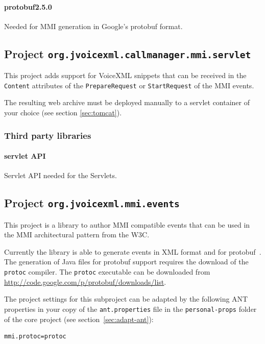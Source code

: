 \documentclass[11pt,a4paper]{article}
\begin{document}
\paragraph{protobuf2.5.0}

Needed for MMI generation in Google's protobuf format.

\subsection{Project \texttt{org.jvoicexml.callmanager.mmi.servlet}}
\label{sec:mmi-servlet}

This project adds support for VoiceXML snippets that can be received
in the \lstinline{Content} attributes of the \lstinline{PrepareRequest}
or \lstinline{StartRequest} of the MMI events.

The resulting web archive must be deployed manually to a servlet container
of your choice (see section \ref{sec:tomcat}).

\subsubsection{Third party libraries}

\paragraph{servlet API}

Servlet API needed for the Servlets.

\subsection{Project \texttt{org.jvoicexml.mmi.events}}
\label{sec:mmi-events}

This project is a library to author MMI compatible events that can be used in
the MMI architectural pattern from the W3C.

Currently the library is able to generate events in XML format and for
protobuf~\cite{google:protobuf}. The generation of Java files for protobuf
support requires the download of the \texttt{protoc} compiler. The \texttt{protoc}
executable can be downloaded from \url{http://code.google.com/p/protobuf/downloads/list}.

The project settings for this subproject can be adapted by the following ANT
properties in your copy of the \texttt{ant.properties} file in the
\texttt{personal-props} folder of the core project (see 
section~\ref{sec:adapt-ant}):
\begin{lstlisting}
mmi.protoc=protoc
\end{lstlisting}
\end{document}
